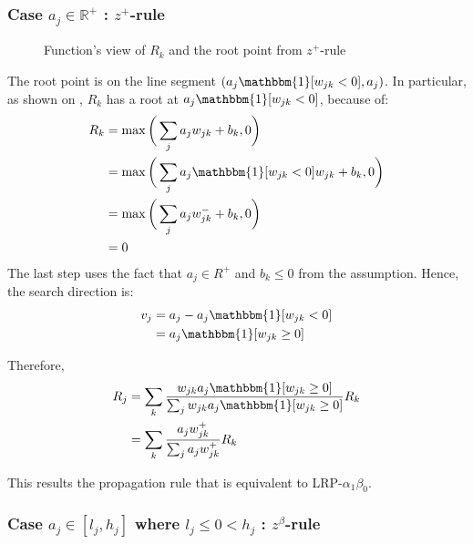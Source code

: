 \subsubsection{Case $a_j \in \mathbb{R}^+$ : $z^+$-rule}
\begin{figure}[!htb]
\centering
{}
\caption{Function's view of $R_k$ and the root point from $z^+$-rule}
\label{fig:zplus_rule_cases}
\end{figure}

The root point is on the line segment $( a_j \mathbbm{1}[ w_{jk}  < 0 ], a_j )$. In particular, as shown on \addfigure{\ref{fig:zplus_rule_cases}}, $R_k$ has a root at $a_j \mathbbm{1}[w_{jk}  < 0 ]$, because of:
\begin{align}	
R_k &= \max \bigg( \sum_j a_j w_{jk } + b_k, 0 \bigg) \\
&=  \max \bigg( \sum_j a_j \mathbbm{1}[ w_{jk}  < 0 ] w_{jk} + b_k, 0 \bigg) \\
&=  \max \bigg(\sum_j a_j  w_{jk}^- + b_k , 0\bigg) \\
&= 0 \label{eq:zplus_rk_zero}
\end{align}
The last step uses the fact that $a_j \in R^+$ and $b_k \le 0$ from the assumption. Hence, the search direction is:
\begin{align}
	v_j &= a_j - a_j \mathbbm{1}[ w_{jk}  < 0 ] \\
	&= a_j \mathbbm{1}[ w_{jk}  \ge 0 ]
\end{align}




Therefore, 
\begin{align}
		R_j &=	\sum_k \frac{ w_{jk} a_j \mathbbm{1}[w_{jk}  \ge 0 ]  }{\sum_{j} w_{jk} a_j \mathbbm{1}[ w_{jk}  \ge 0 ]}  R_k\\
		&=	\sum_k  \frac{ a_j  w_{jk}^+   }{\sum_{j}  a_j w_{jk}^+  }  R_k
\end{align}

This results the propagation rule that  is equivalent to LRP-$\alpha_1\beta_0$. 


\subsubsection{Case $a_j \in [l_j , h_j]$ where $l_j \le 0 < h_j $ : $z^\beta$-rule}

